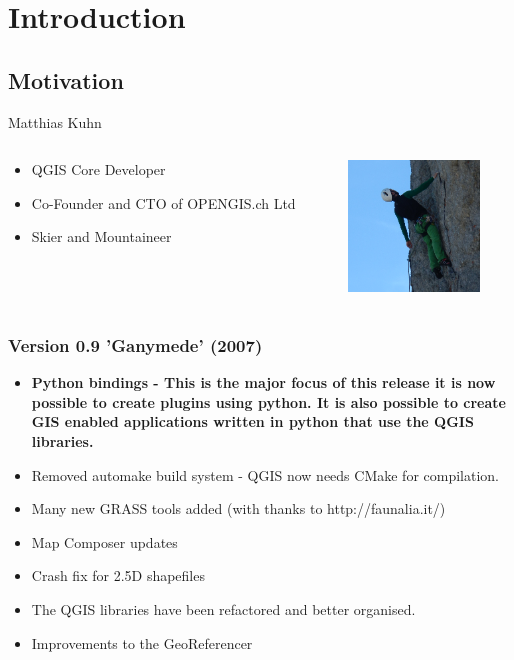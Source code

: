 \section{Introduction}

\subsection{Motivation}

\begin{frame}{Matthias Kuhn}
	\begin{columns}[T] %
		\begin{column}[T]{5cm} %
			\begin{itemize}
				\item QGIS Core Developer
				\item Co-Founder and CTO of OPENGIS.ch Ltd
				\item Skier and Mountaineer
			\end{itemize}
		\end{column}
		\begin{column}[T]{5cm} %
			\includegraphics[height=3.5cm]{img/matthias.png}
		\end{column}
	\end{columns}
\end{frame}

\begin{frame}
\frametitle{Version 0.9 'Ganymede' (2007)}
	\begin{itemize}
		\item \textbf{Python bindings - This is the major focus of this release
			it is now possible to create plugins using python. It is also
			possible to create GIS enabled applications written in python 
			that use the QGIS libraries.}
		\item Removed automake build system - QGIS now needs CMake for compilation.
		\item Many new GRASS tools added (with thanks to http://faunalia.it/)
		\item Map Composer updates
		\item Crash fix for 2.5D shapefiles
		\item The QGIS libraries have been refactored and better organised.
		\item Improvements to the GeoReferencer
	\end{itemize}
\end{frame}

